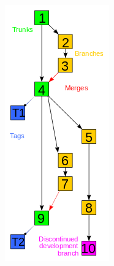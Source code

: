 \documentclass[english,compress]{beamer}
\begin{document}
{\begin{columns}
\begin{column}{.3\textwidth}
\begin{center}
    \includegraphics[width=.8\textwidth]{figs/vc-graph.png}
    \end{center}
    \end{column}
    \end{columns}
}
\end{document}
